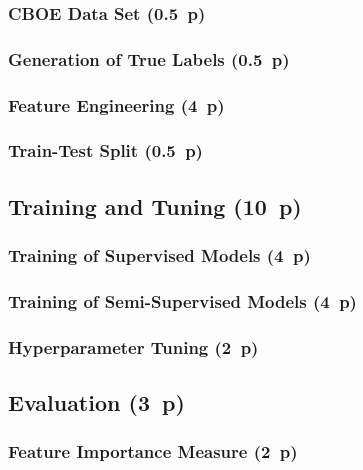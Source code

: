 \subsubsection{CBOE Data Set (0.5~p)}\label{cboe-data-set}

\subsubsection{Generation of True
  Labels (0.5~p)}\label{generation-of-true-labels}

\subsubsection{Feature Engineering (4~p)}\label{feature-engineering}

\subsubsection{Train-Test Split (0.5~p)}\label{train-test-split}

\subsection{Training and Tuning (10~p)}\label{training-and-tuning}

\subsubsection{Training of Supervised
  Models (4~p)}\label{training-of-supervised-models}


\subsubsection{Training of Semi-Supervised
  Models (4~p)}\label{training-of-semi-supervised-models}


\subsubsection{Hyperparameter Tuning (2~p)}\label{hyperparameter-tuning}


\subsection{Evaluation (3~p)}\label{evaluation}

\subsubsection{Feature Importance
  Measure (2~p)}\label{feature-importance-measure}

